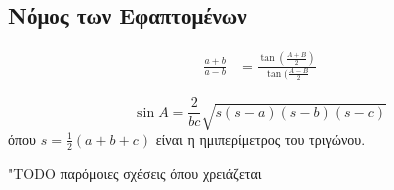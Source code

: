\subsection{Νόμος των Εφαπτομένων}

\begin{align*} 
   \frac{a + b}{a - b} &= \frac{\tan{(\frac{A + B}{2})}}{\tan{(\frac{A - B}{2}}} 
   \end{align*}

   \[
       \sin{A} = \frac{2}{bc} \sqrt{s(s-a)(s-b)(s-c)} 
   \]
   όπου $ s= \frac{1}{2} (a+b+c) $ είναι η ημιπερίμετρος του τριγώνου.

   "TODO παρόμοιες σχέσεις όπου χρειάζεται


